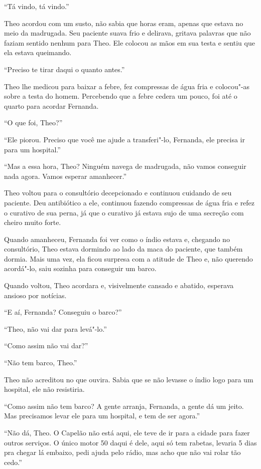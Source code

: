 \asterisc


``Tá vindo, tá vindo.''

Theo acordou com um susto, não sabia que horas eram, apenas que estava
no meio da madrugada. Seu paciente suava frio e delirava, gritava
palavras que não faziam sentido nenhum para Theo. Ele colocou as mãos em
sua testa e sentiu que ela estava queimando.

``Preciso te tirar daqui o quanto antes.''

Theo lhe medicou para baixar a febre, fez compressas de água fria e
colocou"-as sobre a testa do homem. Percebendo que a febre cedera um
pouco, foi até o quarto para acordar Fernanda.

``O que foi, Theo?''

``Ele piorou. Preciso que você me ajude a transferi"-lo, Fernanda, ele
precisa ir para um hospital.''

``Mas a essa hora, Theo? Ninguém navega de madrugada, não vamos
conseguir nada agora. Vamos esperar amanhecer.''

Theo voltou para o consultório decepcionado e continuou cuidando de seu
paciente. Deu antibiótico a ele, continuou fazendo compressas de água
fria e refez o curativo de sua perna, já que o curativo já estava sujo
de uma secreção com cheiro muito forte.

Quando amanheceu, Fernanda foi ver como o índio estava e, chegando no
consultório, Theo estava dormindo ao lado da maca do paciente, que
também dormia. Mais uma vez, ela ficou surpresa com a atitude de Theo e,
não querendo acordá"-lo, saiu sozinha para conseguir um barco.

Quando voltou, Theo acordara e, visivelmente cansado e abatido, esperava
ansioso por notícias.

``E aí, Fernanda? Conseguiu o barco?''

``Theo, não vai dar para levá"-lo.''

``Como assim não vai dar?''

``Não tem barco, Theo.''

Theo não acreditou no que ouvira. Sabia que se não levasse o índio logo
para um hospital, ele não resistiria.

``Como assim não tem barco? A gente arranja, Fernanda, a gente dá um
jeito. Mas precisamos levar ele para um hospital, e tem de ser agora.''

``Não dá, Theo. O Capelão não está aqui, ele teve de ir para a cidade
para fazer outros serviços. O único motor 50 daqui é dele, aqui só tem
rabetas, levaria 5 dias pra chegar lá embaixo, pedi ajuda pelo rádio,
mas acho que não vai rolar tão cedo.''

